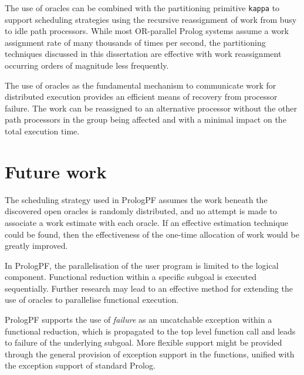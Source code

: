 The use of oracles can be combined with the partitioning primitive
\texttt{kappa} to support scheduling strategies using the recursive reassignment of
work from busy to idle path processors.  
While most OR-parallel Prolog systems assume a work assignment rate of many thousands
of times per second, the partitioning techniques discussed in this dissertation are
effective with work reassignment occurring orders of magnitude less frequently.

The use of oracles as the fundamental mechanism to communicate work for distributed
execution provides an efficient means of recovery from processor failure.  The work
can be reassigned to an alternative processor without the other path processors in the
group being affected and with a minimal impact on the total execution time.

\section{Future work} %

The scheduling strategy used in PrologPF assumes the work beneath the
discovered open oracles is randomly distributed, and no attempt is made to
associate a work estimate with each oracle.  If an effective estimation technique
could be found, then the effectiveness of the one-time allocation of work would be
greatly improved.

In PrologPF, the parallelisation of the user program is limited to the 
logical component.  Functional reduction within a specific subgoal is executed
sequentially.  Further research may lead to an effective method for extending the
use of oracles to parallelise functional execution.

PrologPF supports the use of \textit{failure} as an uncatchable exception within
a functional reduction, which is propagated to the top level function call and
leads to failure of the underlying subgoal.  More flexible support might be
provided through the general provision of exception support in the functions,
unified with the exception support of standard Prolog.






